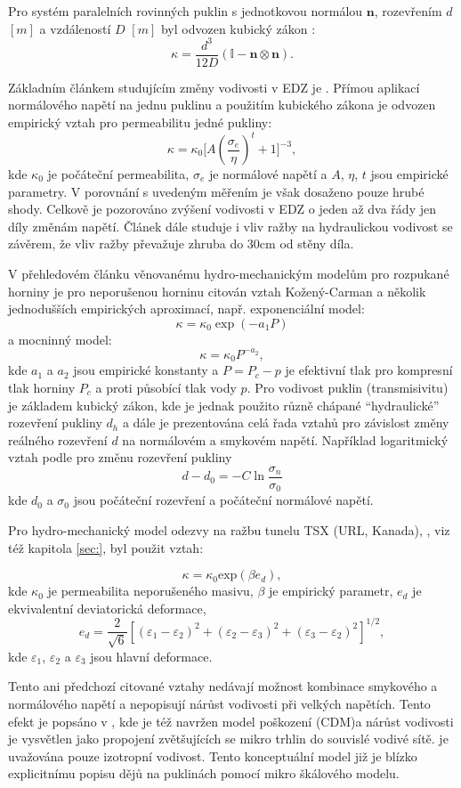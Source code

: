 \documentclass{article}
\def\vc#1{\mathbf{\boldsymbol{#1}}}     %
\def\tn#1{{\mathbb{#1}}}    %
\begin{document}
Pro systém paralelních rovinných puklin s jednotkovou normálou $\vc n$, rozevřením $d$ $[m]$ a vzdáleností $D$ $[m]$
byl odvozen kubický zákon \cite{Snow1969}:
\[
 \kappa = \frac{d^3}{12 D} (\tn I - \vc n \otimes \vc n).
\]

Základním článkem studujícím změny vodivosti v EDZ je \cite{Kelsall1984}. Přímou aplikací normálového napětí
na jednu puklinu a použitím kubického zákona je odvozen empirický vztah pro permeabilitu jedné pukliny:
\[
  \kappa = \kappa_0 \Big[A (\frac{\sigma_e}{\eta})^t+1\Big]^{-3},
\]
kde $\kappa_0$ je počáteční permeabilita, $\sigma_e$ je normálové napětí a $A$, $\eta$, $t$ jsou empirické parametry.
V porovnání s uvedeným měřením je však dosaženo pouze hrubé shody. Celkově je pozorováno zvýšení vodivosti v EDZ o jeden až dva řády jen díly změnám napětí.
Článek dále studuje i vliv ražby na hydraulickou vodivost se závěrem, že vliv ražby převažuje zhruba do 30cm od stěny díla. 


V přehledovém článku \cite{Rutqvist2003} věnovanému hydro-mechanickým modelům pro rozpukané horniny
je pro neporušenou horninu citován vztah Kožený-Carman a několik jednodušších empirických aproximací, např.
exponenciální model:
\[
  \kappa=\kappa_0 \exp(-a_1 P)
\]
a 
mocninný model:
\[
  \kappa=\kappa_0 P^{-a_2},
\]
kde $a_1$ a $a_2$ jsou empirické konstanty a $P=P_c - p$ je efektivní tlak pro kompresní tlak horniny $P_c$ a proti působící tlak vody $p$.
Pro vodivost puklin (transmisivitu) je základem kubický zákon, kde je jednak použito různě chápané ``hydraulické'' rozevření pukliny $d_h$ 
a dále je prezentována celá řada vztahů pro závislost změny reálného rozevření $d$ na normálovém a smykovém napětí. Například logaritmický vztah 
podle \cite{Kohl1995} pro změnu rozevření pukliny
\[
   d - d_0 = - C \ln \frac{\sigma_n}{\sigma_0}
\]
kde $d_0$ a $\sigma_0$ jsou počáteční rozevření a počáteční normálové napětí. 

Pro hydro-mechanický model odezvy na ražbu tunelu TSX (URL, Kanada), \cite{Rutqvist2009}, viz též kapitola \ref{sec:}, byl použit vztah:

$$
	\kappa = \kappa_0 \mbox{exp}(\beta e_d),
$$
kde $\kappa_0$ je permeabilita neporušeného masivu, $\beta$ je empirický parametr, $e_d$ je ekvivalentní
deviatorická deformace,
$$
	e_d = \frac{2}{\sqrt{6}}[(\varepsilon_1 - \varepsilon_2)^2 + (\varepsilon_2 - \varepsilon_3)^2 + (\varepsilon_3 - \varepsilon_2)^2]^{1/2},
$$
kde $\varepsilon_1$, $\varepsilon_2$ a $\varepsilon_3$ jsou hlavní deformace.


Tento ani předchozí citované vztahy nedávají možnost kombinace smykového a normálového napětí a nepopisují 
nárůst vodivosti při velkých napětích. Tento efekt je popsáno v \cite{Souley2001}, kde je též navržen model poškození (CDM)a 
nárůst vodivosti je vysvětlen jako propojení zvětšujících se mikro trhlin do souvislé vodivé sítě.
je uvažována pouze izotropní vodivost. Tento konceptuální model již je blízko explicitnímu popisu dějů na puklinách 
pomocí mikro škálového modelu.
\end{document}
